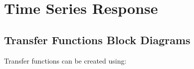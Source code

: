 \documentclass[12pt,letter]{article}
\numberwithin{ex}{section} %
\numberwithin{re}{section} %
\numberwithin{equation}{section}	%
\begin{document}
%	
%	

	\setcounter{section}{3}	
	\setcounter{figure}{0}   
	\renewcommand\thefigure{\thesection.\arabic{figure}}


\section{Time Series Response}

\subsection{Transfer Functions Block Diagrams}


Transfer functions can be created using:
\end{document}
